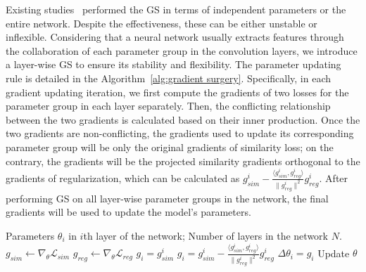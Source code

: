 \documentclass[runningheads]{llncs}
\begin{document}
Existing studies~\cite{mansilla2021domain,yu2020gradient} performed the GS in terms of independent parameters or the entire network. 
Despite the effectiveness, these can be either unstable or inflexible. Considering that a neural network usually extracts features through the collaboration of each parameter group in the convolution layers, we introduce a layer-wise GS to ensure its stability and flexibility. The parameter updating rule is detailed in the Algorithm~\ref{alg:gradient surgery}. Specifically, in each gradient updating iteration, we first compute the gradients of two losses for the parameter group in each layer separately. Then, the conflicting relationship between the two gradients is calculated based on their inner production. Once the two gradients are non-conflicting, the gradients used to update its corresponding parameter group will be only the original gradients of similarity loss; on the contrary, the gradients will be the projected similarity gradients orthogonal to the gradients of regularization, which can be calculated as $g_{sim}^{i} - \frac{\langle g_{sim}^{i}, g_{reg}^{i} \rangle}{\| g_{reg}^{i} \|^2} g_{reg}^{i}$. After performing GS on all layer-wise parameter groups in the network, the final gradients will be used to update the model's parameters.
\begin{minipage}{.75\linewidth}
\centering
\begin{algorithm}[H]
\caption{Gradient surgery}
\label{alg:gradient surgery}
\begin{algorithmic}[1]
\Require Parameters $\theta_i$ in $i$th layer of the network; Number of layers in the network $N$. 
\State $g_{sim} \gets \nabla_\theta \mathcal{L}_{sim}$
\State $g_{reg} \gets \nabla_\theta \mathcal{L}_{reg}$
    \State $g_i = g_{sim}^{i}$
\Else
    \State $g_i = g_{sim}^{i} - \frac{\langle g_{sim}^{i}, g_{reg}^{i} \rangle}{\| g_{reg}^{i} \|^2} g_{reg}^{i}$
\EndIf
\State $\Delta \theta_{i} = g_i$
\EndFor
\State Update $\theta$
\end{algorithmic}
\end{algorithm}
\end{minipage}
\end{document}
